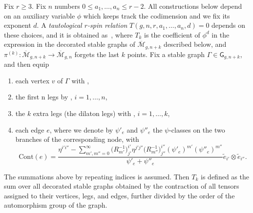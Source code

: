 \documentclass[pdftex]{sigma}
\def\oM{\overline{\mathcal{M}}}
\numberwithin{equation}{section}
\begin{document}
Fix $r\geq 3$. Fix $n$ numbers $0\leq a_1,\dots,a_n\leq r-2$. All constructions below depend on an auxiliary variable $\phi$ which keeps track
the codimension and we fix its exponent $d$. A {\em tautological $r$-spin relation} $T(g,n,r,a_1,\dots,a_n,d)=0$ depends on these choices, and it is obtained as~, where $T_k$ is the coefficient of $\phi^d$ in the expression in the decorated stable graphs of $\oM_{g,n+k}$ described below, and $\pi^{(k)}\colon \oM_{g,n+k}\to \oM_{g,n}$ forgets the last $k$ points.
Fix a stable graph $\Gamma \in \mathsf{G}_{g,n+k}$, and then equip
\begin{enumerate}\itemsep=0pt
\item[(i)] each vertex $v$ of $\Gamma$ with ,

\item[(ii)]the first n legs by , $i=1,\dots,n$,

\item[(iii)]the $k$ extra legs (the dilaton legs) with , $i=1,\dots,k$,

\item[(iv)]each edge $e$, where we denote by $\psi'_e$ and $\psi''_e$ the $\psi$-classes on the two branches of the corresponding node, with
\[
\mathrm{Cont}(e)= \frac{\eta^{i'i''}-\sum_{m',m''=0}^\infty \big(R^{-1}_{m'}\big)_{j'}^{i'} \eta^{j'j''} \big(R^{-1}_{m''}\big)_{j''}^{i''} (\psi'_e)^{m'}(\psi''_e)^{m''} }{\psi'_e+\psi''_e} \widetilde{e}_{i'}\otimes \widetilde{e}_{i''}.
\]
\end{enumerate}
The summations above by repeating indices is assumed.
Then $T_k$ is defined as the sum over all decorated stable graphs obtained by the contraction of all tensors assigned to their vertices, legs, and edges, further divided by the order of the automorphism group of the graph.
\end{document}
